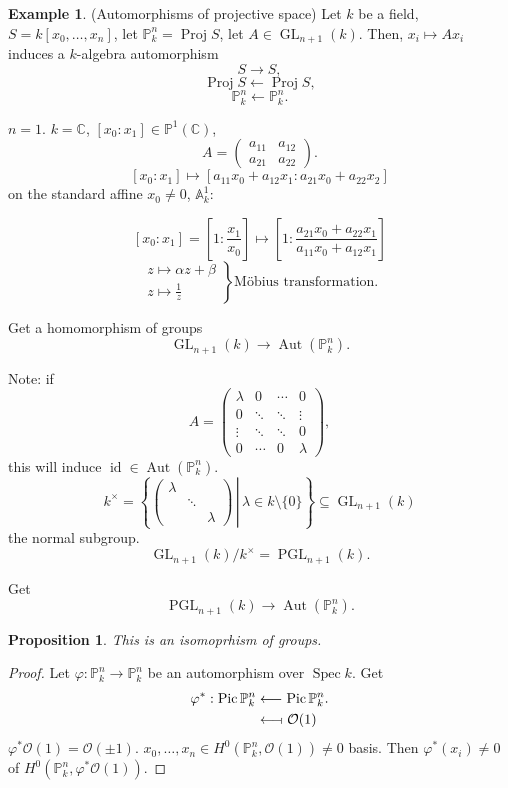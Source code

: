\documentclass[12pt]{article}
\DeclareMathOperator{\id}{id}
\DeclareMathOperator{\Spec}{Spec}
\DeclareMathOperator{\Proj}{Proj}
\DeclareMathOperator{\GL}{GL}
\DeclareMathOperator{\PGL}{PGL}
\DeclareMathOperator{\Pic}{Pic}
\DeclareMathOperator{\Aut}{Aut}
\newtheorem*{proposition}{Proposition}
\theoremstyle{definition}
\newtheorem*{example}{Example}
\theoremstyle{remark}
\newtheorem*{comment}{Comment}
\begin{document}
\begin{example}
(Automorphisms of projective space) Let $k$ be a field, $S=k[x_0,\ldots,x_n]$, let $\mathbb{P}_k^n=\Proj S$, let $A\in\GL_{n+1}(k)$. Then, $x_i\mapsto Ax_i$ induces a $k$-algebra automorphism
\[S\longrightarrow S,\]
\[\Proj S\longleftarrow\Proj S,\]
\[\mathbb{P}_k^n\longleftarrow\mathbb{P}_k^n.\]

$n=1$. $k=\mathbb{C}$, $[x_0:x_1]\in\mathbb{P}^1(\mathbb{C})$,
\[A=\left(\begin{matrix}a_{11}&a_{12}\\a_{21}&a_{22}\end{matrix}\right).\]
\[[x_0:x_1]\longmapsto[a_{11}x_0+a_{12}x_1:a_{21}x_0+a_{22}x_2]\]
on the standard affine $x_0\neq0$, $\mathbb{A}_k^1$:

\[[x_0:x_1]=\left[1:\frac{x_1}{x_0}\right]\longmapsto\left[1:\frac{a_{21}x_0+a_{22}x_1}{a_{11}x_0+a_{12}x_1}\right]\]
\[\left.\begin{array}{l}z\longmapsto\alpha z+\beta\\z\longmapsto\frac{1}{z}\end{array}\right\}\text{M\"{o}bius transformation.}\]

Get a homomorphism of groups
\[\GL_{n+1}(k)\longrightarrow\Aut(\mathbb{P}_k^n).\]

Note: if
\[A=\left(\begin{matrix}\lambda&0&\cdots&0\\0&\ddots&\ddots&\vdots\\\vdots&\ddots&\ddots&0\\0&\cdots&0&\lambda\end{matrix}\right),\]
this will induce $\id\in\Aut(\mathbb{P}_k^n)$.
\[k^{\times}=\left\{\left.\left(\begin{matrix}\lambda\\&\ddots\\&&\lambda\end{matrix}\right)\,\right|\,\lambda\in k\setminus\{0\}\right\}\subseteq\GL_{n+1}(k)\]
the normal subgroup.
\[\GL_{n+1}(k)/k^{\times}=\PGL_{n+1}(k).\]
\begin{comment}
This is the projective linear group.
\end{comment}

Get
\[\PGL_{n+1}(k)\longrightarrow\Aut(\mathbb{P}_k^n).\]

\begin{proposition}
This is an isomoprhism of groups.
\end{proposition}

\begin{proof}
Let $\varphi:\mathbb{P}_k^n\rightarrow\mathbb{P}_k^n$ be an automorphism over $\Spec k$. Get
\begin{align*}
\varphi^*:\Pic\mathbb{P}_k^n&\longleftarrow\Pic\mathbb{P}_k^n.\\
&\longleftarrow\!\shortmid\mathcal{O}(1)
\end{align*}
$\varphi^*\mathcal{O}(1)=\mathcal{O}(\pm1)$. $x_0,\ldots,x_n\in H^0(\mathbb{P}_k^n,\mathcal{O}(1))\neq0$ basis. Then $\varphi^*(x_i)\neq0$ of $H^0(\mathbb{P}_k^n,\varphi^*\mathcal{O}(1))$.


\end{proof}
\end{example}
\end{document}
